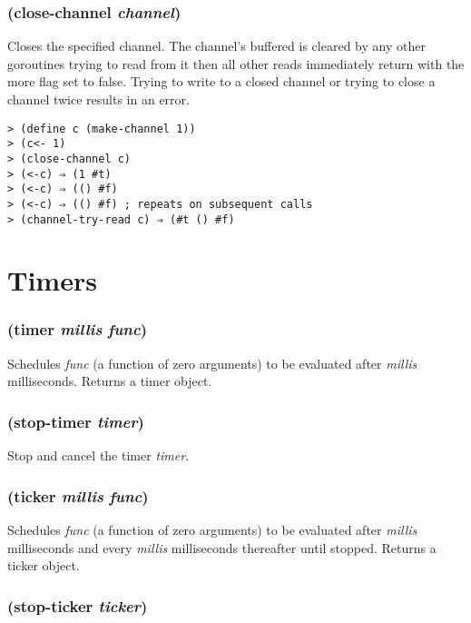 \documentclass{article}
\begin{document}
\subsubsection{(close-channel \emph{channel})}

Closes the specified channel. The channel's buffered is cleared by any other goroutines trying
to read from it then all other reads immediately return with the more flag set to false.
Trying to write to a closed channel or trying to close a channel twice results in an error.

\begin{verbatim}
> (define c (make-channel 1))
> (c<- 1)
> (close-channel c)
> (<-c) ⇒ (1 #t)
> (<-c) ⇒ (() #f)
> (<-c) ⇒ (() #f) ; repeats on subsequent calls
> (channel-try-read c) ⇒ (#t () #f)
\end{verbatim}

\section{Timers}\label{sec:timers}

\subsubsection{(timer \emph{millis} \emph{func})}

Schedules \emph{func} (a function of zero arguments) to be evaluated after \emph{millis}
milliseconds. Returns a timer object.

\subsubsection{(stop-timer \emph{timer})}

Stop and cancel the timer \emph{timer}.

\subsubsection{(ticker \emph{millis} \emph{func})}

Schedules \emph{func} (a function of zero arguments) to be evaluated after \emph{millis}
milliseconds and every \emph{millis} milliseconds thereafter until stopped. Returns a ticker
object.

\subsubsection{(stop-ticker \emph{ticker})}
\end{document}
